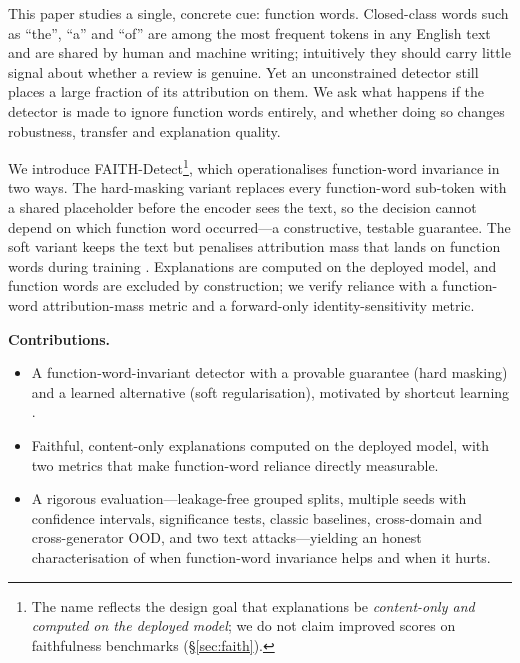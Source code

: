\documentclass[11pt]{article}
\begin{document}
This paper studies a single, concrete cue: function words. Closed-class words such as ``the'', ``a'' and ``of'' are among the most frequent tokens in any English text and are shared by human and machine writing; intuitively they should carry little signal about whether a review is genuine. Yet an unconstrained detector still places a large fraction of its attribution on them. We ask what happens if the detector is made to ignore function words entirely, and whether doing so changes robustness, transfer and explanation quality.

We introduce FAITH-Detect\footnote{The name reflects the design goal that explanations be \emph{content-only and computed on the deployed model}; we do not claim improved scores on faithfulness benchmarks (\S\ref{sec:faith}).}, which operationalises function-word invariance in two ways. The hard-masking variant replaces every function-word sub-token with a shared placeholder before the encoder sees the text, so the decision cannot depend on which function word occurred---a constructive, testable guarantee. The soft variant keeps the text but penalises attribution mass that lands on function words during training \cite{ross}. Explanations are computed on the deployed model, and function words are excluded by construction; we verify reliance with a function-word attribution-mass metric and a forward-only identity-sensitivity metric.

\noindent\textbf{Contributions.}
\begin{itemize}
\item A function-word-invariant detector with a provable guarantee (hard masking) and a learned alternative (soft regularisation), motivated by shortcut learning \cite{geirhos,gururangan,mccoy}.
\item Faithful, content-only explanations computed on the deployed model, with two metrics that make function-word reliance directly measurable.
\item A rigorous evaluation---leakage-free grouped splits, multiple seeds with confidence intervals, significance tests, classic baselines, cross-domain and cross-generator OOD, and two text attacks---yielding an honest characterisation of when function-word invariance helps and when it hurts.
\end{itemize}
\end{document}
